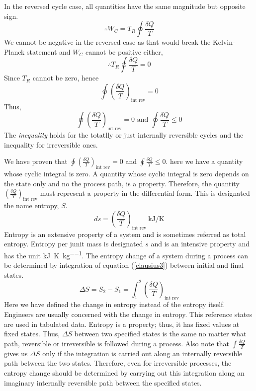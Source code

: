 \documentclass[class=report, crop=false, 12pt,a4paper]{standalone}
\numberwithin{equation}{section}
\begin{document}
In the reversed cycle case, all quantities have the same magnitude but opposite sign.
\begin{equation}
  \therefore W_C = T_R \oint \frac{\delta Q}{T}
\end{equation}
We cannot be negative in the reversed case as that would break the Kelvin-Planck statement and \(W_C\) cannot be positive either, 
\begin{equation}
  \therefore T_R \oint \frac{\delta Q}{T} = 0
\end{equation}
Since \(T_R\) cannot be zero, hence
\begin{equation}
  \oint \left( \frac{\delta Q}{T} \right)_{\textrm{int rev}} = 0
\end{equation}
Thus,
\begin{equation}
  \oint \left( \frac{\delta Q}{T} \right)_{\textrm{int rev}} = 0 \textrm{ and } \oint \frac{\delta Q}{T} \leq 0
\end{equation}
The \emph{inequality} holds for the totatlly or just internally reversible cycles and the inequality for irreversible ones.

We have proven that \( \oint \left( \frac{\delta Q}{T} \right)_{\textrm{int rev}} = 0 \) and \( \oint \frac{\delta Q}{T} \leq 0 \). here we have a quantity whose cyclic integral is zero. A quantity whose cyclic integral is zero depends on the state only and no the process path, is a property. Therefore, the quantity \( \left( \frac{\delta Q}{T} \right)_{\textrm{int rev}} \) must represent a property in the differential form. This is designated the name entropy, \(S\). 
\begin{equation}
  ds = \left( \frac{\delta Q}{T} \right)_{\textrm{int rev}} \ \si{\kilo\joule\per\kelvin} \label{clausius3}
\end{equation}
Entropy is an extensive property of a system and is sometimes referred as total entropy. Entropy per junit mass is designated \( s\) and is an intensive property and has the unit \si{\kilo\joule\per\kelvin\per\kg}. The entropy change of a system during a process can be determined by integration of equation (\ref{clausius3}) between initial and final states.
\begin{equation}
  \Delta S = S_2 - S_1 = \int_1^2 \left( \frac{\delta Q}{T} \right)_{\textrm{int rev}}
\end{equation}
Here we have defined the change in entropy instead of the entropy itself. Engineers are usually concerned with the change in entropy. This reference states are used in tabulated data. Entropy is a property; thus, it has fixed values at fixed states. Thus, \(\Delta S\) between two specified states is the same no matter what path, reversible or irreversible is followed during a process. Also note that \( \int \frac{\delta Q}{T}\) gives us \(\Delta S\) only if the integration is carried out along an internally reversible path between the two states. Therefore, even for irreversible processes, the entropy change should be determined by carrying out this integration along an imaginary internally reversible path between the specified states.
\end{document}
